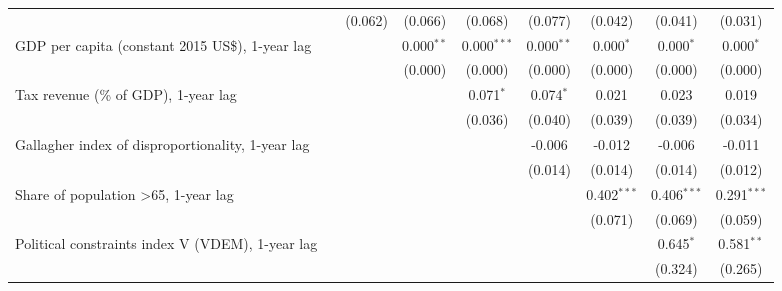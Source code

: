 \begin{table}[htbp]
\begin{tabular}{lcccccccc}
                                                                                                      &         & (0.062) & (0.066)       & (0.068)       & (0.077)      & (0.042)       & (0.041)       & (0.031)\\   
      GDP per capita (constant 2015 US\$), 1-year lag                                                 &         &         & 0.000$^{**}$  & 0.000$^{***}$ & 0.000$^{**}$ & 0.000$^{*}$   & 0.000$^{*}$   & 0.000$^{*}$\\   
                                                                                                      &         &         & (0.000)       & (0.000)       & (0.000)      & (0.000)       & (0.000)       & (0.000)\\   
      Tax revenue (\% of GDP), 1-year lag                                                             &         &         &               & 0.071$^{*}$   & 0.074$^{*}$  & 0.021         & 0.023         & 0.019\\   
                                                                                                      &         &         &               & (0.036)       & (0.040)      & (0.039)       & (0.039)       & (0.034)\\   
      Gallagher index of disproportionality, 1-year lag                                               &         &         &               &               & -0.006       & -0.012        & -0.006        & -0.011\\   
                                                                                                      &         &         &               &               & (0.014)      & (0.014)       & (0.014)       & (0.012)\\   
      Share of population >65, 1-year lag                                                             &         &         &               &               &              & 0.402$^{***}$ & 0.406$^{***}$ & 0.291$^{***}$\\   
                                                                                                      &         &         &               &               &              & (0.071)       & (0.069)       & (0.059)\\   
      Political constraints index V (VDEM), 1-year lag                                                &         &         &               &               &              &               & 0.645$^{*}$   & 0.581$^{**}$\\   
                                                                                                      &         &         &               &               &              &               & (0.324)       & (0.265)\\   

\end{tabular}
\end{table}
